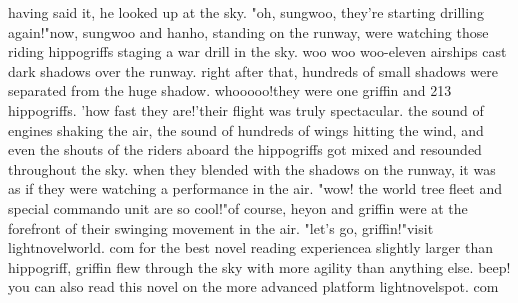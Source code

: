 having said it, he looked up at the sky.
"oh, sungwoo, they're starting drilling again!"now, sungwoo and hanho, standing on the runway, were watching those riding hippogriffs staging a war drill in the sky.
woo woo woo-eleven airships cast dark shadows over the runway.
 right after that, hundreds of small shadows were separated from the huge shadow.
whooooo!they were one griffin and 213 hippogriffs.
'how fast they are!'their flight was truly spectacular.
the sound of engines shaking the air, the sound of hundreds of wings hitting the wind, and even the shouts of the riders aboard the hippogriffs got mixed and resounded throughout the sky.
when they blended with the shadows on the runway, it was as if they were watching a performance in the air.
"wow! the world tree fleet and special commando unit are so cool!"of course, heyon and griffin were at the forefront of their swinging movement in the air.
"let's go, griffin!"visit lightnovelworld.
com for the best novel reading experiencea slightly larger than hippogriff, griffin flew through the sky with more agility than anything else.
beep! you can also read this novel on the more advanced platform lightnovelspot.
com

 